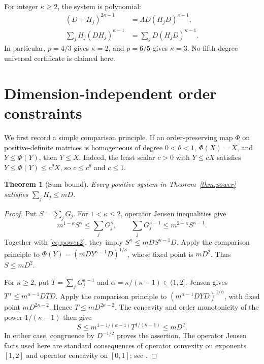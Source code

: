 \documentclass[11pt]{article}
\newtheorem{theorem}{Theorem}[section]
\theoremstyle{remark}\newtheorem{remark}[theorem]{Remark}
\begin{document}
For integer \(\kappa\ge2\), the system is polynomial:
\begin{align*}
 (D+H_j)^{2\kappa-1}&=\Lambda D(H_jD)^{\kappa-1},\\
 \sum_jH_j(DH_j)^{\kappa-1}&=\sum_jD(H_jD)^{\kappa-1}.
\end{align*}
In particular, \(p=4/3\) gives \(\kappa=2\), and \(p=6/5\) gives \(\kappa=3\). No fifth-degree universal certificate is claimed here.

\section{Dimension-independent order constraints}
We first record a simple comparison principle. If an order-preserving map \(\Phi\) on positive-definite matrices is homogeneous of degree \(0<\theta<1\), \(\Phi(X)=X\), and \(Y\le\Phi(Y)\), then \(Y\le X\). Indeed, the least scalar \(c>0\) with \(Y\le cX\) satisfies \(Y\le\Phi(Y)\le c^\theta X\), so \(c\le c^\theta\) and \(c\le1\).

\begin{theorem}[Sum bound]\label{thm:sum}
Every positive system in Theorem~\ref{thm:power} satisfies \(\sum_jH_j\le mD\).
\end{theorem}
\begin{proof}
Put \(S=\sum_jG_j\). For \(1<\kappa\le2\), operator Jensen inequalities give
\[
 m^{1-\kappa}S^\kappa\le\sum_jG_j^\kappa,
 \qquad \sum_jG_j^{\kappa-1}\le m^{2-\kappa}S^{\kappa-1}.
\]
Together with \eqref{eq:power2}, they imply \(S^\kappa\le mDS^{\kappa-1}D\). Apply the comparison principle to
\(\Phi(Y)=(mDY^{\kappa-1}D)^{1/\kappa}\), whose fixed point is \(mD^2\). Thus \(S\le mD^2\).

For \(\kappa\ge2\), put \(T=\sum_jG_j^{\kappa-1}\) and \(\alpha=\kappa/(\kappa-1)\in(1,2]\). Jensen gives
\(T^\alpha\le m^{\alpha-1}DTD\). Apply the comparison principle to \((m^{\alpha-1}DYD)^{1/\alpha}\), with fixed point \(mD^{2\kappa-2}\). Hence \(T\le mD^{2\kappa-2}\). The concavity and order monotonicity of the power \(1/(\kappa-1)\) then give
\[
 S\le m^{1-1/(\kappa-1)}T^{1/(\kappa-1)}\le mD^2.
\]
In either case, congruence by \(D^{-1/2}\) proves the assertion. The operator Jensen facts used here are standard consequences of operator convexity on exponents \([1,2]\) and operator concavity on \([0,1]\); see \cite{jensen}.
\end{proof}
\end{document}
